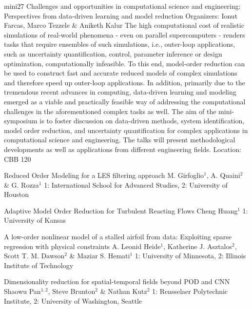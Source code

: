 \mini
{mini27}
{Challenges and opportunities in computational science and engineering: Perspectives from data-driven learning and model reduction}
{Organizers: Ionut Farcas, Marco Tezzele \& Aniketh Kalur}
{The high computational cost of realistic simulations of real-world phenomena - even on parallel supercomputers - renders tasks that require ensembles of such simulations, i.e., outer-loop applications, such as uncertainty quantification, control, parameter inference or design optimization, computationally infeasible. To this end, model-order reduction can be used to construct fast and accurate reduced models of complex simulations and therefore speed up outer-loop applications. In addition, primarily due to the tremendous recent advances in computing, data-driven learning and modeling emerged as a viable and practically feasible way of addressing the computational challenges in the aforementioned complex tasks as well. The aim of the mini-symposium is to foster discussion on data-driven methods, system identification, model order reduction, and uncertainty quantification for complex applications in computational science and engineering. The talks will present methodological developments as well as applications from different engineering fields.}
{Location: CBB 120}

\begin{talks}
\item\talk
{Reduced Order Modeling for a LES filtering approach}
{M. Girfoglio$^{1}$, A. Quaini$^{2}$ \& G. Rozza$^{1}$}
{1: International School for Advanced Studies, 2: University of Houston}
\item\talk
{Adaptive Model Order Reduction for Turbulent Reacting Flows}
{Cheng Huang$^{1}$}
{1: University of Kansas}
\item\talk
{A low-order nonlinear model of a stalled airfoil from data: Exploiting sparse regression with physical constraints}
{A. Leonid Heide$^{1}$, Katherine J. Asztalos$^{2}$, Scott T. M. Dawson$^{2}$ \& Maziar S. Hemati$^{1}$}
{1: University of Minnesota, 2: Illinois Institute of Technology}
\item\talk
{Dimensionality reduction for spatial-temporal fields beyond POD and CNN}
{Shaowu Pan$^{1,2}$, Steve Brunton$^{2}$ \& Nathan Kutz$^{2}$}
{1: Rensselaer Polytechnic Institute, 2: University of Washington, Seattle}
\end{talks}
\room
